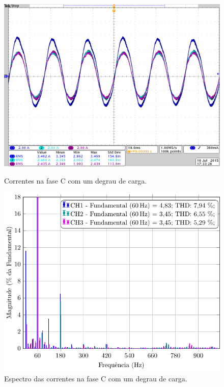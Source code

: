 \documentclass[
	article,			%
	12pt,				%
	twoside,			%
	a4paper,			%
	english,			%
	brazil,				%
	sumario=tradicional
	]{abntex2-modelo-notas-de-aula}
\begin{document}
\begin{figure}[!h]
	\centering
	\begin{minipage}[t]{0.45\textwidth}	\centering
		\includegraphics[width=1\linewidth]{aqs/tek0001}
		\caption{Correntes na fase C com um degrau de carga.}
		\label{fig:currenttek0001}
	\end{minipage}
	\quad
	\begin{minipage}[t]{0.45\textwidth} 	\centering
		\includegraphics[width=1\linewidth]{aqs/tek0001FFT}
		\caption{Espectro das correntes na fase C com um degrau de carga.}
		\label{fig:currentFFTtek0001}
	\end{minipage}	
\end{figure}
\end{document}
